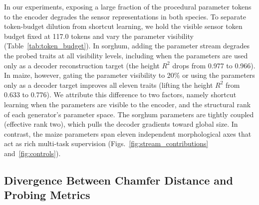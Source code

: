 \documentclass[10pt,twocolumn,letterpaper]{article}
\begin{document}
In our experiments, exposing a large fraction of the procedural parameter tokens to the encoder degrades the sensor representations in both species. To separate token-budget dilution from shortcut learning, we hold the visible sensor token budget fixed at 117.0 tokens and vary the parameter visibility (Table~\ref{tab:token_budget}). In sorghum, adding the parameter stream degrades the probed traits at all visibility levels, including when the parameters are used only as a decoder reconstruction target (the height $R^2$ drops from 0.977 to 0.966). In maize, however, gating the parameter visibility to 20\% or using the parameters only as a decoder target improves all eleven traits (lifting the height $R^2$ from 0.633 to 0.776). We attribute this difference to two factors, namely shortcut learning when the parameters are visible to the encoder, and the structural rank of each generator's parameter space. The sorghum parameters are tightly coupled (effective rank two), which pulls the decoder gradients toward global size. In contrast, the maize parameters span eleven independent morphological axes that act as rich multi-task supervision (Figs.~\ref{fig:stream_contributions} and~\ref{fig:controls}).

\subsection{Divergence Between Chamfer Distance and Probing Metrics}
\label{sec:res-metrics}\label{sec:exp-metrics}
\end{document}

